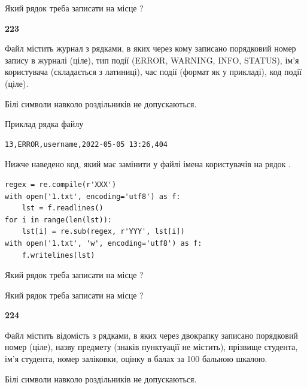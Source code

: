 Який рядок треба записати на місце  ?\par


\newpage

{\begin {center}\textbf{ 223}\end {center}}\par
Файл  містить журнал з рядками, в яких через кому записано поряд\-ко\-вий номер запису в журналі (ціле), тип події (ERROR, WARNING, INFO, STATUS), ім'я користувача (складається з латиниці), час події (фор\-мат як у прикладі), код події (ціле).

Білі символи навколо роздільників не допускаються.

Приклад рядка файлу



\begin{verbatim}
13,ERROR,username,2022-05-05 13:26,404
\end{verbatim}


Нижче наведено код, який має замінити у файлі імена користувачів на рядок .



\begin{verbatim}
regex = re.compile(r'XXX')
with open('1.txt', encoding='utf8') as f:
    lst = f.readlines()
for i in range(len(lst)):
    lst[i] = re.sub(regex, r'YYY', lst[i])
with open('1.txt', 'w', encoding='utf8') as f:
    f.writelines(lst)
\end{verbatim}







Який рядок треба записати на місце  ?\par
\vspace{5mm}


Який рядок треба записати на місце  ?\par


\newpage

{\begin {center}\textbf{ 224}\end {center}}\par
Файл  містить відомість з рядками, в яких через двокрапку записано поряд\-ковий номер (ціле), назву предмету (знаків пунктуації не містить), прізвище студента, ім'я студента, номер заліковки, оцінку в балах за 100 бальною шкалою.

Білі символи навколо роздільників не допускаються.

